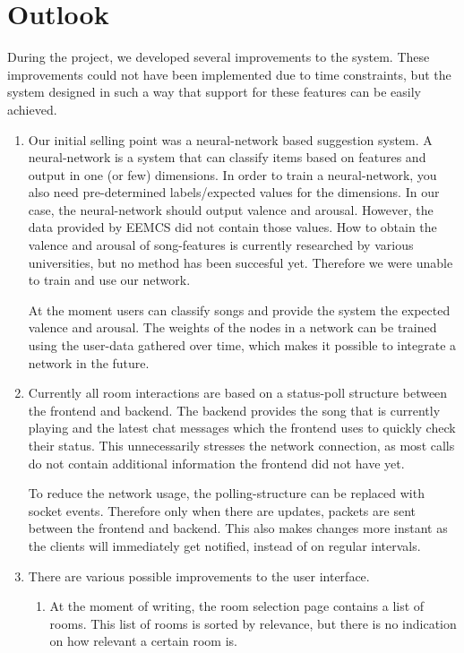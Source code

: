 \chapter{Outlook}
During the project, we developed several improvements to the system.
These improvements could not have been implemented due to time constraints, but the system designed in such a way that support for these features can be easily achieved.

\begin{enumerate}
\item Our initial selling point was a neural-network based suggestion system.
A neural-network is a system that can classify items based on features and output in one (or few) dimensions.
In order to train a neural-network, you also need pre-determined labels/expected values for the dimensions.
In our case, the neural-network should output \gls{valence} and \gls{arousal}.
However, the data provided by EEMCS did not contain those values.
How to obtain the valence and arousal of song-features is currently researched by various universities, but no method has been succesful yet.
Therefore we were unable to train and use our network.

At the moment users can classify songs and provide the system the expected valence and arousal.
The weights of the nodes in a network can be trained using the user-data gathered over time, which makes it possible to integrate a network in the future.

\item Currently all room interactions are based on a status-poll structure between the frontend and backend.
The backend provides the song that is currently playing and the latest chat messages which the frontend uses to quickly check their status.
This unnecessarily stresses the network connection, as most calls do not contain additional information the frontend did not have yet.

To reduce the network usage, the polling-structure can be replaced with socket events.
Therefore only when there are updates, packets are sent between the frontend and backend.
This also makes changes more instant as the clients will immediately get notified, instead of on regular intervals.

\item There are various possible improvements to the user interface.

\begin{enumerate}
\item At the moment of writing, the room selection page contains a list of rooms.
This list of rooms is sorted by relevance, but there is no indication on how relevant a certain room is.


\end{enumerate}
\end{enumerate}
